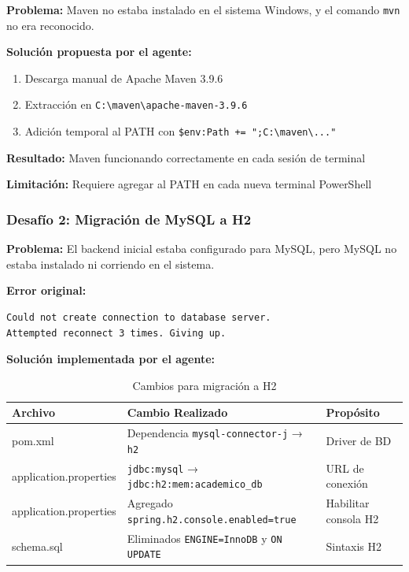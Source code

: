 \documentclass[11pt,a4paper]{article}
\begin{document}
\textbf{Problema:} Maven no estaba instalado en el sistema Windows, y el comando \texttt{mvn} no era reconocido.

\textbf{Solución propuesta por el agente:}
\begin{enumerate}
    \item Descarga manual de Apache Maven 3.9.6
    \item Extracción en \texttt{C:\textbackslash maven\textbackslash apache-maven-3.9.6}
    \item Adición temporal al PATH con \texttt{\$env:Path += ";C:\textbackslash maven\textbackslash..."}
\end{enumerate}

\textbf{Resultado:} Maven funcionando correctamente en cada sesión de terminal

\textbf{Limitación:} Requiere agregar al PATH en cada nueva terminal PowerShell

\subsubsection{Desafío 2: Migración de MySQL a H2}

\textbf{Problema:} El backend inicial estaba configurado para MySQL, pero MySQL no estaba instalado ni corriendo en el sistema.

\textbf{Error original:}
\begin{verbatim}
Could not create connection to database server.
Attempted reconnect 3 times. Giving up.
\end{verbatim}

\textbf{Solución implementada por el agente:}

\begin{table}[H]
\centering
\begin{tabularx}{\textwidth}{|l|X|X|}
\hline
\rowcolor{gray!20}
\textbf{Archivo} & \textbf{Cambio Realizado} & \textbf{Propósito} \\
\hline
pom.xml & Dependencia \texttt{mysql-connector-j} → \texttt{h2} & Driver de BD \\
\hline
application.properties & \texttt{jdbc:mysql} → \texttt{jdbc:h2:mem:academico\_db} & URL de conexión \\
\hline
application.properties & Agregado \texttt{spring.h2.console.enabled=true} & Habilitar consola H2 \\
\hline
schema.sql & Eliminados \texttt{ENGINE=InnoDB} y \texttt{ON UPDATE} & Sintaxis H2 \\
\hline
\end{tabularx}
\caption{Cambios para migración a H2}
\end{table}
\end{document}
